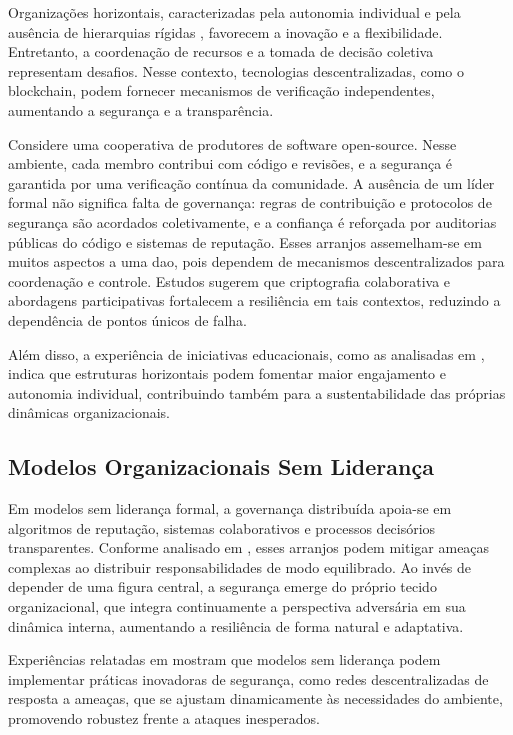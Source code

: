 Organizações horizontais, caracterizadas pela autonomia
individual e pela ausência de hierarquias rígidas
\cite{Reputation-basedDAO,
SocialMediaTeamsAsDigitalVanguards}, favorecem a inovação e
a flexibilidade. Entretanto, a coordenação de recursos e a
tomada de decisão coletiva representam desafios. Nesse
contexto, tecnologias descentralizadas, como o blockchain,
podem fornecer mecanismos de verificação independentes,
aumentando a segurança e a transparência.

Considere uma cooperativa de produtores de software
open-source. Nesse ambiente, cada membro contribui com
código e revisões, e a segurança é garantida por uma
verificação contínua da comunidade. A ausência de um líder
formal não significa falta de governança: regras de
contribuição e protocolos de segurança são acordados
coletivamente, e a confiança é reforçada por auditorias
públicas do código e sistemas de reputação. Esses arranjos
assemelham-se em muitos aspectos a uma \gls{dao}, pois
dependem de mecanismos descentralizados para coordenação e
controle. Estudos \cite{AbcCrypto} sugerem que criptografia
colaborativa e abordagens participativas fortalecem a
resiliência em tais contextos, reduzindo a dependência de
pontos únicos de falha.

Além disso, a experiência de iniciativas educacionais, como
as analisadas em \cite{EscoladaPonte}, indica que
estruturas horizontais podem fomentar maior engajamento e
autonomia individual, contribuindo também para a
sustentabilidade das próprias dinâmicas organizacionais.

\subsection{Modelos Organizacionais Sem Liderança}
\label{sec:modelos_sem_lideranca}

Em modelos sem liderança formal, a governança distribuída
apoia-se em algoritmos de reputação, sistemas colaborativos
e processos decisórios transparentes. Conforme analisado em
\cite{FromCounterpublicstoContentious, EverydayRevolutions},
esses arranjos podem mitigar ameaças complexas ao distribuir
responsabilidades de modo equilibrado. Ao invés de depender
de uma figura central, a segurança emerge do próprio tecido
organizacional, que integra continuamente a perspectiva
adversária em sua dinâmica interna, aumentando a resiliência
de forma natural e adaptativa.

Experiências relatadas em \cite{Non-HierarchicalForms}
mostram
que modelos sem liderança podem implementar práticas
inovadoras de segurança, como redes descentralizadas de
resposta a ameaças, que se ajustam dinamicamente às
necessidades do ambiente, promovendo robustez frente a
ataques inesperados.

